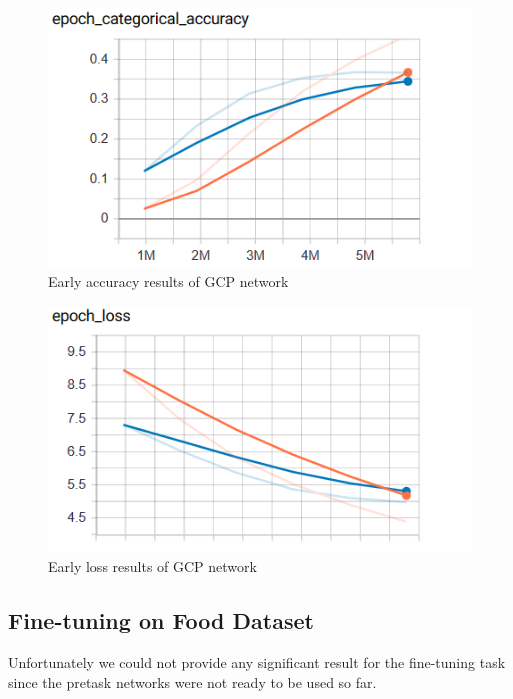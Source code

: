 \begin{figure}[!ht]
    \centering
    \includegraphics[scale=0.60]{images/GCP_early_accuracy.png}
    \caption{Early accuracy results of GCP network}
    \label{fig:early_GCP_acc}
\end{figure}
\begin{figure}[!ht]
    \centering
    \includegraphics[scale=0.60]{images/GCP_early_loss.png}
    \caption{Early loss results of GCP network}
    \label{fig:early_GCP_loss}
\end{figure}




\subsection{Fine-tuning on Food Dataset}
Unfortunately we could not provide any significant result for the fine-tuning task since the pretask networks were not ready to be used so far.



